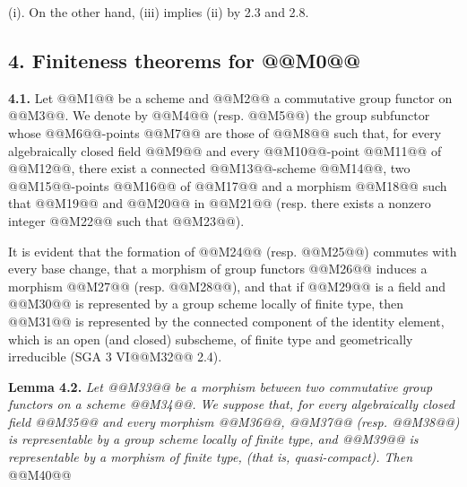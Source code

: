 (i). On the other hand, (iii) implies (ii) by 2.3 and 2.8.

\subsection*{4. Finiteness theorems for @@M0@@}

\textbf{4.1.} Let @@M1@@ be a scheme and @@M2@@ a commutative group functor on @@M3@@. We denote by @@M4@@ (resp. @@M5@@) the group subfunctor whose @@M6@@-points @@M7@@ are those of @@M8@@ such that, for every algebraically closed field @@M9@@ and every @@M10@@-point @@M11@@ of @@M12@@, there exist a connected @@M13@@-scheme @@M14@@, two @@M15@@-points @@M16@@ of @@M17@@ and a morphism @@M18@@ such that @@M19@@ and @@M20@@ in @@M21@@ (resp. there exists a nonzero integer @@M22@@ such that @@M23@@).

It is evident that the formation of @@M24@@ (resp. @@M25@@) commutes with every base change, that a morphism of group functors @@M26@@ induces a morphism @@M27@@ (resp. @@M28@@), and that if @@M29@@ is a field and @@M30@@ is represented by a group scheme locally of finite type, then @@M31@@ is represented by the connected component of the identity element, which is an open (and closed) subscheme, of finite type and geometrically irreducible (SGA 3 VI@@M32@@ 2.4).

\textbf{Lemma 4.2.} \emph{Let @@M33@@ be a morphism between two commutative group functors on a scheme @@M34@@. We suppose that, for every algebraically closed field @@M35@@ and every morphism @@M36@@, @@M37@@ (resp. @@M38@@) is representable by a group scheme locally of finite type, and @@M39@@ is representable by a morphism of finite type, (that is, quasi-compact). Then}
@@M40@@

